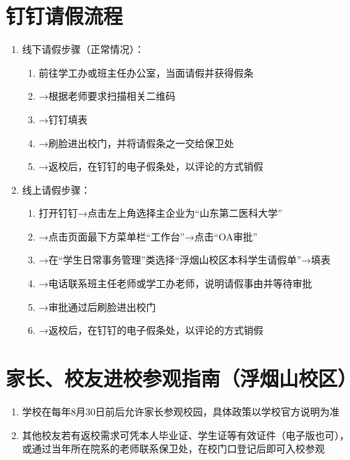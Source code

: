 \section[钉钉请假流程]{钉钉请假\footnotemark 流程}
\label{leave_dingtalk}
\begin{enumerate}
      \item 线下请假步骤（正常情况）：
            \begin{enumerate}
                  \item 前往学工办或班主任办公室，当面请假并获得假条
                  \item →根据老师要求扫描相关二维码
                  \item →钉钉填表
                  \item →刷脸进出校门，并将请假条之一交给保卫处
                  \item →返校后，在钉钉的电子假条处，以评论的方式销假
            \end{enumerate}
      \item 线上请假步骤：
            \begin{enumerate}
                  \item 打开钉钉→点击左上角选择主企业为“山东第二医科大学”
                  \item →点击页面最下方菜单栏“工作台”→点击“OA审批”
                  \item →在“学生日常事务管理”类选择“浮烟山校区本科学生请假单”→填表
                  \item →电话联系班主任老师或学工办老师，说明请假事由并等待审批
                  \item →审批通过后刷脸进出校门
                  \item →返校后，在钉钉的电子假条处，以评论的方式销假
            \end{enumerate}
\end{enumerate}

\section[家长、校友进校参观指南（浮烟山校区）]{家长、校友进校参观指南（浮烟山校区）}
\begin{enumerate}
      \item 学校在每年8月30日前后允许家长参观校园\footnotemark，具体政策以学校官方说明为准
      \item 其他校友若有返校需求可凭本人毕业证、学生证等有效证件（电子版也可），或通过当年所在院系的老师联系保卫处，在校门口登记后即可入校参观
\end{enumerate}

